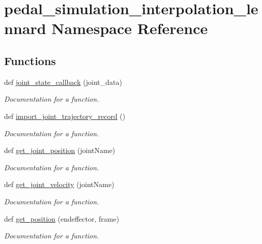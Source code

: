 \hypertarget{namespacepedal__simulation__interpolation__lennard}{}\section{pedal\+\_\+simulation\+\_\+interpolation\+\_\+lennard Namespace Reference}
\label{namespacepedal__simulation__interpolation__lennard}
\subsection*{Functions}
\begin{DoxyCompactItemize}
\item 
def \mbox{\hyperlink{namespacepedal__simulation__interpolation__lennard_a735569bc5de68e16c821e5775ce86006}{joint\+\_\+state\+\_\+callback}} (joint\+\_\+data)
\begin{DoxyCompactList}\small\item\em Documentation for a function. \end{DoxyCompactList}\item 
def \mbox{\hyperlink{namespacepedal__simulation__interpolation__lennard_a1788cd58724313e3c344b3a39eb4869b}{import\+\_\+joint\+\_\+trajectory\+\_\+record}} ()
\begin{DoxyCompactList}\small\item\em Documentation for a function. \end{DoxyCompactList}\item 
def \mbox{\hyperlink{namespacepedal__simulation__interpolation__lennard_a0b60a370d2c02e0e44226668a0518cbf}{get\+\_\+joint\+\_\+position}} (joint\+Name)
\begin{DoxyCompactList}\small\item\em Documentation for a function. \end{DoxyCompactList}\item 
def \mbox{\hyperlink{namespacepedal__simulation__interpolation__lennard_a0f7bc83a1c0f5751283e2947e9785790}{get\+\_\+joint\+\_\+velocity}} (joint\+Name)
\begin{DoxyCompactList}\small\item\em Documentation for a function. \end{DoxyCompactList}\item 
def \mbox{\hyperlink{namespacepedal__simulation__interpolation__lennard_a97cd1e9dca64b0e48544ed0e325570e0}{get\+\_\+position}} (endeffector, frame)
\begin{DoxyCompactList}\small\item\em Documentation for a function. \end{DoxyCompactList}\item 

\end{DoxyCompactItemize}
